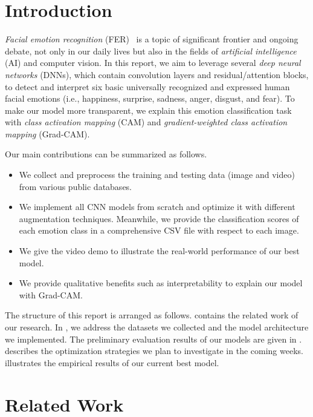 \section{Introduction}
\label{sec:intro}

\textit{Facial emotion recognition} (FER)~\cite{Ko18,JainSS19} is a topic of significant frontier and ongoing debate, 
not only in our daily lives but also in the fields of \textit{artificial intelligence} (AI) and computer vision.
In this report, we aim to leverage several \textit{deep neural networks} (DNNs), 
which contain convolution layers and residual/attention blocks, 
to detect and interpret six basic universally recognized and expressed human facial emotions 
(i.e., happiness, surprise, sadness, anger, disgust, and fear). 
To make our model more transparent, 
we explain this emotion classification task with \textit{class activation mapping} (CAM) 
and \textit{gradient-weighted class activation mapping} (Grad-CAM). 

Our main contributions can be summarized as follows. %
\begin{itemize}
  \item We collect and preprocess the training and testing data (image and video) from various public databases. 
  \item We implement all CNN models from scratch and optimize it with different augmentation techniques. 
  Meanwhile, we provide the classification scores of each emotion class in a comprehensive CSV file with respect to each image. 
  \item We give the video demo to illustrate the real-world performance of our best model.
  \item We provide qualitative benefits such as interpretability to explain our model with Grad-CAM. 
\end{itemize}

The structure of this report is arranged as follows. 
 contains the related work of our research. 
In , 
we address the datasets we collected and the model architecture we implemented. 
The preliminary evaluation results of our models are given in . 
 describes the optimization strategies we plan to investigate in the coming weeks. 
 illustrates the empirical results of our current best model. 


\section{Related Work}
\label{sec:related}

